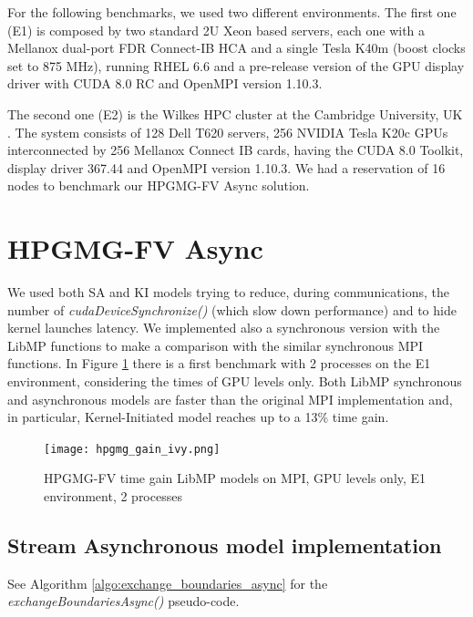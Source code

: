 \documentclass[review]{siamart1116}
\begin{document}
For the following benchmarks, we used two different environments.
The first one (E1) is composed by two standard 2U Xeon based
servers, each one with a Mellanox dual-port FDR Connect-IB HCA and a single
Tesla K40m (boost clocks set to 875 MHz), running RHEL 6.6 and a
pre-release version of the GPU display driver with CUDA 8.0 RC and OpenMPI version 1.10.3.

The second one (E2) is the Wilkes HPC cluster at the Cambridge
University, UK \cite{wilkes}. The system consists of 128 Dell T620 servers, 256 NVIDIA Tesla K20c GPUs interconnected by 256 Mellanox Connect IB cards, having the CUDA 8.0 Toolkit, display driver 367.44 and OpenMPI version 1.10.3. We had a reservation of 16 nodes to benchmark our HPGMG-FV Async solution.

\section{HPGMG-FV Async}\label{sec:hpgmg_async}

We used both SA and KI models trying to reduce, during communications, the number of
\textit{cudaDeviceSynchronize()} (which slow down performance) and to
hide kernel launches latency. We implemented also a synchronous
version with the LibMP functions to make a comparison with the similar
synchronous MPI functions. In Figure \ref{fig:hpgmg_gai_ivy} there is
a first benchmark with 2 processes on the E1 environment, considering
the times of GPU levels only. Both LibMP synchronous and asynchronous
models are faster than the original MPI implementation and, in particular,
Kernel-Initiated model reaches up to a 13\% time gain.


\begin{figure}[h]
\centering
\texttt{[image: hpgmg\_gain\_ivy.png]}
\caption{HPGMG-FV time gain LibMP models on MPI, GPU levels only, E1 environment, 2 processes}
\label{fig:hpgmg_gai_ivy}
\end{figure}

\subsection{Stream Asynchronous model implementation}\label{sec:sahpgmg}

See Algorithm \ref{algo:exchange_boundaries_async} for the \textit{exchangeBoundariesAsync()} pseudo-code.
\end{document}
